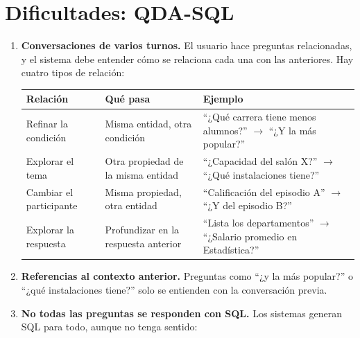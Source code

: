 \documentclass[11pt,a4paper]{article}
\begin{document}
\section{Dificultades: QDA-SQL}
\begin{enumerate}
  \item \textbf{Conversaciones de varios turnos.} El usuario hace preguntas relacionadas, y el sistema debe entender cómo se relaciona cada una con las anteriores. Hay cuatro tipos de relación:

  \begin{center}
  \small
  \begin{tabularx}{\linewidth}{@{}l X X@{}}
    \toprule
    \textbf{Relación} & \textbf{Qué pasa} & \textbf{Ejemplo} \\
    \midrule
    Refinar la condición & Misma entidad, otra condición & ``¿Qué carrera tiene menos alumnos?'' $\rightarrow$ ``¿Y la más popular?'' \\
    Explorar el tema & Otra propiedad de la misma entidad & ``¿Capacidad del salón X?'' $\rightarrow$ ``¿Qué instalaciones tiene?'' \\
    Cambiar el participante & Misma propiedad, otra entidad & ``Calificación del episodio A'' $\rightarrow$ ``¿Y del episodio B?'' \\
    Explorar la respuesta & Profundizar en la respuesta anterior & ``Lista los departamentos'' $\rightarrow$ ``¿Salario promedio en Estadística?'' \\
    \bottomrule
  \end{tabularx}
  \end{center}
  \item \textbf{Referencias al contexto anterior.} Preguntas como ``¿y la más popular?'' o ``¿qué instalaciones tiene?'' solo se entienden con la conversación previa.
  \item \textbf{No todas las preguntas se responden con SQL.} Los sistemas generan SQL para todo, aunque no tenga sentido:


\end{enumerate}
\end{document}
